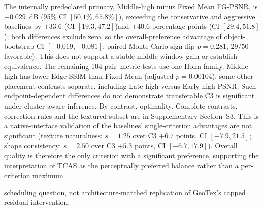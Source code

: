\documentclass[times,twocolumn,final]{elsarticle}
\providecommand{\DIFadd}[1]{{\protect\color{blue} \sf #1}} %
\providecommand{\DIFdel}[1]{{\protect\color{red} \scriptsize #1}} %
\providecommand{\DIFaddbegin}{} %
\providecommand{\DIFaddend}{} %
\providecommand{\DIFdelbegin}{} %
\providecommand{\DIFdelend}{} %
\begin{document}
\DIFadd{The internally predeclared primary, Middle-high minus Fixed Mean FG-PSNR, is $+0.029$~dB }\DIFaddend (95\% \DIFdelbegin \DIFdel{CI $[50.1\%, 65.8\%]$), exceeding the conservative and aggressive baselines by $+33.6$ (CI $[19.3, 47.2]$)and $+40.6$ percentage points (CI $[29.4, 51.8]$); both differences exclude zero, so the overall-preference advantage of }\DIFdelend \DIFaddbegin \DIFadd{object-bootstrap CI $[-0.019,+0.081]$; paired Monte Carlo sign-flip $p=0.281$; 29/50 favorable). This does not support a stable middle-window gain or establish equivalence. The remaining 104 pair--metric tests use one Holm family. Middle-high has lower Edge-SSIM than Fixed Mean (adjusted $p=0.00104$); some other placement contrasts separate, including Late-high versus Early-high PSNR. Such endpoint-dependent differences do not demonstrate transferable }\DIFaddend C3 \DIFdelbegin \DIFdel{is significant under cluster-aware inference. By contrast, }\DIFdelend \DIFaddbegin \DIFadd{optimality. Complete contrasts, correction rules and the textured subset are in Supplementary Section~S3. This is a native-interface validation of }\DIFaddend the \DIFdelbegin \DIFdel{baselines' single-criterion advantages are not significant (texture naturalness: $s = 1.25$ over C3 $+6.7$ points, CI $[-7.9, 21.5]$; shape consistency: $s = 2.50$ over C3 $+5.3$ points, CI $[-6.7, 17.9]$). Overall quality is therefore the only criterion with a significant preference, supporting the interpretation of TCAS as the perceptually preferred balance rather than a per-criterion maximum.
}%

\DIFdelend \DIFaddbegin \DIFadd{scheduling question, not architecture-matched replication of GeoTex's capped residual intervention.
}\DIFaddend
\end{document}
